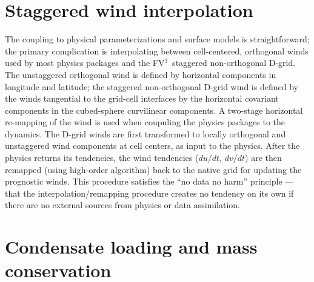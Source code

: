 \documentclass[12pt,letterpaper]{book}
\newcommand{\fv}{FV$^{\mathrm{3}}$}
\begin{document}
\section{Staggered wind interpolation}

The coupling to physical parameterizations and surface models is straightforward; the primary complication is interpolating between cell-centered, orthogonal winds used by most physics packages and the \fv\ staggered non-orthogonal D-grid. The unstaggered orthogonal wind is defined by horizontal components in longitude and latitude; the staggered non-orthogonal D-grid wind is defined by the winds tangential to the grid-cell interfaces by the horizontal covariant components in the cubed-sphere curvilinear components.  A two-stage horizontal re-mapping of the wind is used when coupuling the physics packages to the dynamics.
The D-grid winds are first transformed to locally orthogonal and unstaggered wind components at cell centers, as input to the physics. After the physics returns its tendencies, the wind tendencies ($du/dt$, $dv/dt$) are then remapped (using high-order algorithm) back to the native grid for updating the prognostic winds. This procedure satisfies the ``no data no harm'' principle --- that the interpolation/remapping procedure creates no tendency on its own if there are no external sources from physics or data assimilation. 

\section{Condensate loading and mass conservation}
\end{document}
